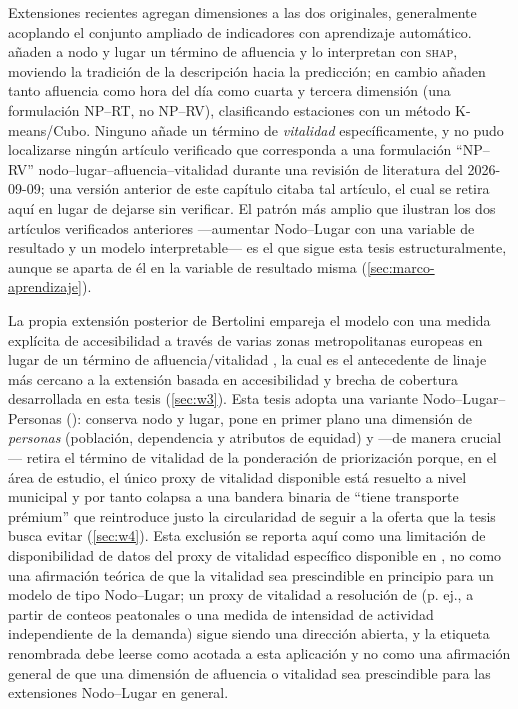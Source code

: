 Extensiones recientes agregan dimensiones a las dos originales, generalmente acoplando el
conjunto ampliado de indicadores con aprendizaje automático. \textcite{su2022nodeplace}
añaden a nodo y lugar un término de afluencia y lo interpretan con \textsc{shap}, moviendo
la tradición de la descripción hacia la predicción; \textcite{aminipishro2022nprt} en
cambio añaden tanto afluencia como hora del día como cuarta y tercera dimensión (una
formulación NP--RT, no NP--RV), clasificando estaciones con un método K-means/Cubo.
Ninguno añade un término de \emph{vitalidad} específicamente, y no pudo localizarse
ningún artículo verificado que corresponda a una formulación ``NP--RV''
nodo--lugar--afluencia--vitalidad durante una revisión de literatura del 2026-09-09; una
versión anterior de este capítulo citaba tal artículo, el cual se retira aquí en lugar de
dejarse sin verificar. El patrón más amplio que ilustran los dos artículos verificados
anteriores ---aumentar Nodo--Lugar con una variable de resultado y un modelo
interpretable--- es el que sigue esta tesis estructuralmente, aunque se aparta de él en la
variable de resultado misma (\cref{sec:marco-aprendizaje}).

La propia extensión posterior de Bertolini empareja el modelo con una medida explícita de
accesibilidad a través de varias zonas metropolitanas europeas en lugar de un término de
afluencia/vitalidad \parencite{papa2015tod}, la cual es el antecedente de linaje más
cercano a la extensión basada en accesibilidad y brecha de cobertura desarrollada en esta
tesis (\cref{sec:w3}). Esta tesis adopta una variante
Nodo--Lugar--Personas (\nppv): conserva nodo y lugar, pone en primer plano una dimensión
de \emph{personas} (población, dependencia y atributos de equidad) y ---de manera
crucial--- retira el término de vitalidad de la ponderación de priorización porque, en el
área de estudio, el único proxy de vitalidad disponible está resuelto a nivel municipal y
por tanto colapsa a una bandera binaria de ``tiene transporte prémium'' que reintroduce
justo la circularidad de seguir a la oferta que la tesis busca evitar (\cref{sec:w4}). Esta
exclusión se reporta aquí como una limitación de disponibilidad de datos del proxy de
vitalidad específico disponible en \zmg, no como una afirmación teórica de que la vitalidad
sea prescindible en principio para un modelo de tipo Nodo--Lugar; un proxy de vitalidad a
resolución de \ageb (p. ej., a partir de conteos peatonales o una medida de intensidad de
actividad independiente de la demanda) sigue siendo una dirección abierta, y la etiqueta
\nppv{} renombrada debe leerse como acotada a esta aplicación y no como una afirmación
general de que una dimensión de afluencia o vitalidad sea prescindible para las
extensiones Nodo--Lugar en general.

